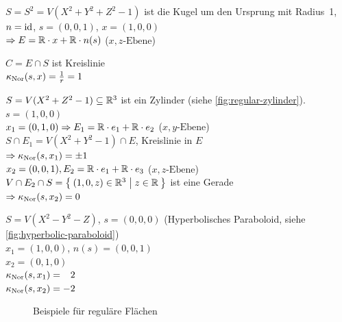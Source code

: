 \begin{beispiel}%
    \begin{bspenum}
        \item $S = S^2 = V(X^2 + Y^2 + Z^2 - 1)$ ist die Kugel um den Ursprung mit Radius~1,
              $n = \textnormal{id}$, $s=(0,0,1)$, $x=(1,0,0)$\\
              $\Rightarrow E = \mathbb{R} \cdot x + \mathbb{R} \cdot n(s)$ ($x,z\text{-Ebene}$)

              $C = E \cap S$ ist Kreislinie\\
              $\kappa_{\textnormal{Nor}}(s, x) = \frac{1}{r} = 1$
        \item $S = V(X^2 + Z^2 - 1) \subseteq \mathbb{R}^3$ ist ein Zylinder (siehe \cref{fig:regular-zylinder}).
              $s = (1,0,0)$\\
              $x_1 = (0,1,0) \Rightarrow E_1 = \mathbb{R} \cdot e_1 + \mathbb{R} \cdot e_2$ ($x,y\text{-Ebene}$)\\
              $S \cap E_1 = V(X^2 + Y^2 - 1) \cap E$, Kreislinie in $E$\\
              $\Rightarrow \kappa_{\textnormal{Nor}}(s, x_1) = \pm 1$\\
              $x_2 = (0, 0, 1), E_2 = \mathbb{R} \cdot e_1 + \mathbb{R} \cdot e_3$ ($x,z\text{-Ebene}$)\\
              $V \cap E_2 \cap S = \Set{(1, 0, z) \in \ensuremath{\mathbb{R}}^3 | z \in \ensuremath{\mathbb{R}}}$ ist eine Gerade\\
              $\Rightarrow \kappa_{\textnormal{Nor}}(s, x_2) = 0$
        \item $S = V(X^2 - Y^2 - Z)$, $s = (0,0,0)$ (Hyperbolisches Paraboloid, siehe \cref{fig:hyperbolic-paraboloid})\\
              $x_1 = (1,0,0)$, $n(s) = (0,0,1)$\\
              $x_2 = (0, 1, 0)$\\
              $\kappa_{\textnormal{Nor}}(s, x_1) = \hphantom{-}2$\\
              $\kappa_{\textnormal{Nor}}(s, x_2) = -2$
    \end{bspenum}
\end{beispiel}

\begin{figure}[ht]
    \centering
    \subfloat[$S = V(X^2 + Z^2 - 1)$]{
        \resizebox{0.4\linewidth}{!}{}
        \label{fig:regular-zylinder}
    }%
    \subfloat[$S = V(X^2 - Y^2 - Z)$]{
        \resizebox{0.4\linewidth}{!}{}
        \label{fig:hyperbolic-paraboloid}
    }%
    \label{fig:regular-surfaces}
    \caption{Beispiele für reguläre Flächen}
\end{figure}

